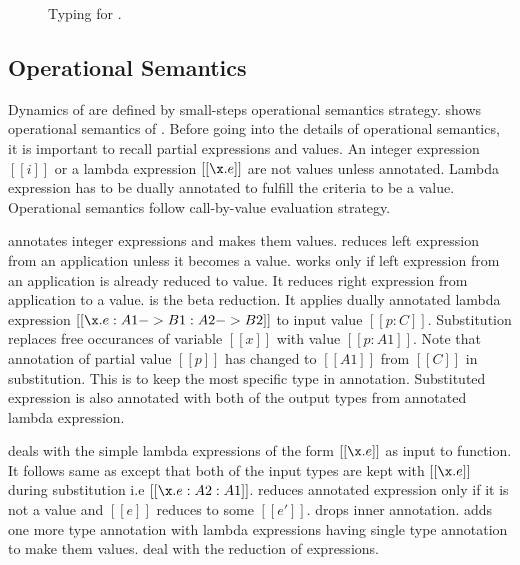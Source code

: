 \begin{figure}[t]
  \begin{small}
    \centering
  \end{small}
  \caption{Typing for \dut.}
  \label{fig:union:typ}
\end{figure}

\subsection{Operational Semantics}
\label{sec:union:os}
Dynamics of \cal are defined by small-steps operational semantics strategy.  shows
operational semantics of \cal. Before going into the details of operational semantics, it is important
to recall partial expressions and values. An integer expression $[[i]]$ or a lambda expression $[[\x.e]]$
are not values unless annotated. Lambda expression has to be dually annotated to fulfill the criteria to
be a value. Operational semantics follow call-by-value evaluation strategy.

 annotates integer expressions and makes them values.  reduces left expression
from an application unless it becomes a value.  works only if left expression from an
application is already reduced to value. It reduces right expression from application to a value.
 is the beta reduction. It applies dually annotated lambda expression 
$[[\x.e : A1 -> B1 : A2 -> B2]]$ to input value $[[p:C]]$. Substitution replaces free occurances of variable
$[[x]]$ with value $[[p:A1]]$. Note that annotation of partial value $[[p]]$ has changed to $[[A1]]$ from 
$[[C]]$ in substitution. This is to keep the most specific type in annotation. Substituted expression is also
annotated with both of the output types from annotated lambda expression. 

 deals with the simple lambda expressions of the form $[[\x.e]]$ as input to function.
It follows same as  except that both of the input types are kept with $[[\x.e]]$ during
substitution i.e $[[\x.e:A2:A1]]$.  reduces annotated expression only if it is not a value
and $[[e]]$ reduces to some $[[e']]$.  drops inner annotation.  adds one
more type annotation with lambda expressions having single type annotation to make them values.
 deal with the reduction of \typeof expressions.

